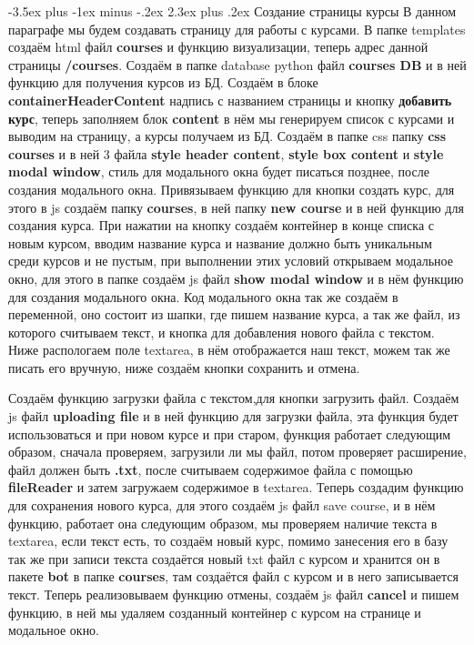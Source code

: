 \documentclass[12pt, oldlfont, amsfonts]{report}
\makeatletter
\renewcommand{\section}{\@startsection{section}{1}{0pt}%
                                {-3.5ex plus -1ex minus -.2ex}%
                                {2.3ex plus .2ex}%
{\centering\hyphenpenalty=10000\normalfont\Large\bfseries}}
\makeatother
\begin{document}
\section{Создание страницы курсы}
В данном параграфе мы будем создавать страницу для работы с курсами. В папке templates создаём html файл {\bf courses} и функцию визуализации, теперь адрес данной страницы {\bf /courses}. Создаём в папке database python файл {\bf courses DB} и в ней функцию для получения курсов из БД. Создаём в блоке {\bf containerHeaderContent} надпись с названием страницы и кнопку {\bf добавить курс}, теперь заполняем блок {\bf content} в нём мы генерируем список с курсами и выводим на страницу, а курсы получаем из БД. Создаём в папке css папку {\bf css courses} и в ней 3 файла {\bf style header content}, {\bf style box content} и {\bf style modal window}, стиль для модального окна будет писаться позднее, после создания модального окна. Привязываем функцию для кнопки создать курс, для этого в js создаём папку {\bf courses}, в ней папку {\bf new course} и в ней функцию для создания курса. При нажатии на кнопку создаём контейнер в конце списка с новым курсом, вводим название курса и название должно быть уникальным среди курсов и не пустым, при выполнении этих условий открываем модальное окно, для этого в папке создаём js файл {\bf show modal window} и в нём функцию для создания модального окна. Код модального окна так же создаём в переменной, оно состоит из шапки, где пишем название курса, а так же файл, из которого считываем текст, и кнопка для добавления нового файла с текстом. Ниже распологаем поле textarea, в нём отображается наш текст, можем так же писать его вручную, ниже создаём кнопки сохранить и отмена. 

Создаём функцию загрузки файла с текстом,для кнопки загрузить файл. Создаём js файл {\bf uploading file} и в ней функцию для загрузки файла, эта функция будет использоваться и при новом курсе и при старом, функция работает следующим образом, сначала проверяем, загрузили ли мы файл, потом проверяет расширение, файл должен быть {\bf .txt}, после считываем содержимое файла с помощью {\bf fileReader} и затем загружаем содержимое в textarea. Теперь создадим функцию для сохранения нового курса, для этого создаём js файл {save course}, и в нём функцию, работает она следующим образом, мы проверяем наличие текста в textarea, если текст есть, то создаём новый курс, помимо занесения его в базу так же при записи текста создаётся новый txt файл с курсом и хранится он в пакете {\bf bot} в папке {\bf courses}, там создаётся файл с курсом и в него записывается текст. Теперь реализовываем функцию отмены, создаём js файл {\bf cancel} и пишем функцию, в ней мы удаляем созданный контейнер с курсом на странице и модальное окно.
\end{document}
